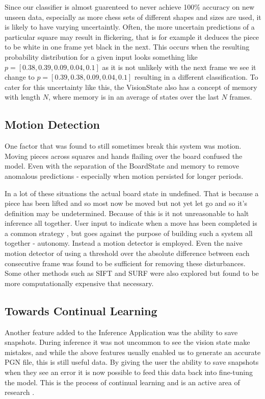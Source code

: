 Since our classifier is almost guarenteed to never achieve 100\% accuracy on new unseen data, especially as more chess sets of different shapes and sizes are used, it 
is likely to have varying uncertaintly.  Often, the more uncertain predictions of a particular square may result in flickering, that is for example it deduces the piece to 
be white in one frame yet black in the next.  This occurs when the resulting probability distribution for a given input looks something like 
$p = [0.38, 0.39, 0.09, 0.04, 0.1]$ as it is not unlikely with the next frame we see it change to $p = [0.39, 0.38, 0.09, 0.04, 0.1]$ resulting in a different classification.
To cater for this uncertainty like this, the VisionState also has a concept of memory with length $N$, where memory is in an average of states 
over the last $N$ frames.

\subsection{Motion Detection}
One factor that was found to still sometimes break this system was motion.  Moving pieces across squares and hands flailing over the board confused the
model.  Even with the separation of the BoardState and memory to remove anomalous predictions - especially when motion persisted for longer periods.  

In a lot of these situations the actual board state in undefined.  That is because a piece has been lifted and so most now be moved but not yet let go 
and so it's definition may be undetermined.  Because of this is it not unreasonable to halt inference all together.  User input to indicate when a move
has been completed is a common strategy \cite{}, but goes against the purpose of building such a system all together - autonomy.  Instead a motion detector is 
employed.  Even the naive motion detector of using a threshold over the absolute difference between each consecutive frame was found to be sufficient for removing these
disturbances.  Some other methods such as SIFT and SURF were also explored but found to be more computationally expensive that necessary.

\subsection{Towards Continual Learning}
Another feature added to the Inference Application was the ability to save snapshots.  During inference it was not uncommon to see the vision state make mistakes,
and while the above features usually enabled us to generate an accurate PGN file, this is still useful data.
By giving the user the ability to save snapshots when they see an error it is now possible to feed this data back into fine-tuning the model.  This is the process of 
continual learning and is an active area of research \cite{}.